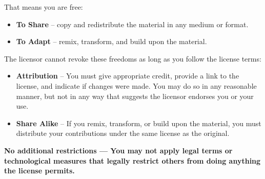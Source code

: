    \scriptsize
   \noindent
    That means you are free:
      \begin{itemize}
        \setlength{\itemsep}{0pt}
        \setlength{\parskip}{0pt}
        \setlength{\parsep}{0pt} 
         \item \textbf{To Share} -- copy and redistribute the material in any medium or format.
         \item \textbf{To Adapt} -- remix, transform, and build upon the material.
      \end{itemize}
    The licensor cannot revoke these freedoms as long as you follow the license terms: \par
      \begin{itemize}
        \setlength{\itemsep}{0pt}
        \setlength{\parskip}{0pt}
        \setlength{\parsep}{0pt}
          \item \textbf{Attribution} -- You must give appropriate credit, provide a link to the license, and indicate if changes were made. You may do so in any reasonable manner, but not in any way that suggests the licensor endorses you or your use. \par
          \item \textbf{Share Alike} -- If you remix, transform, or build upon the material, you must distribute your contributions under the same license as the original. \par
      \end{itemize}
    \textbf{No additional restrictions — You may not apply legal terms or technological measures that legally restrict others from doing anything the license permits.}

    \normalfont
    \normalsize

\clearpage